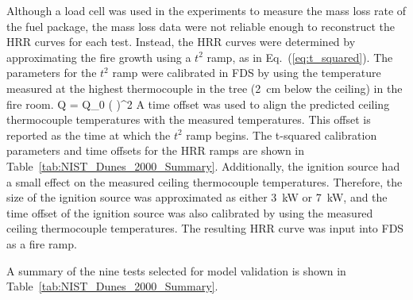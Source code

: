 Although a load cell was used in the experiments to measure the mass loss rate of the fuel package, the mass loss data
were not reliable enough to reconstruct the HRR curves for each test. Instead, the HRR curves were determined by approximating
the fire growth using a $t^2$ ramp, as in Eq.~(\ref{eq:t_squared}). The parameters for the $t^2$ ramp were calibrated in FDS
by using the temperature measured at the highest thermocouple in the tree (2~cm below the ceiling) in the fire room.
\be
\dot Q = \dot Q_0 \left(  \right)^2
\label{eq:t_squared}
\ee
A time offset was used to align the predicted ceiling thermocouple temperatures with the measured temperatures.
This offset is reported as the time at which the $t^2$ ramp begins.
The t-squared calibration parameters and time offsets for the HRR ramps are shown in Table~\ref{tab:NIST_Dunes_2000_Summary}.
Additionally, the ignition source had a small effect on the measured ceiling thermocouple temperatures. Therefore,
the size of the ignition source was approximated as either 3~kW or 7~kW, and the time offset of the ignition source was
also calibrated by using the measured ceiling thermocouple temperatures.
The resulting HRR curve was input into FDS as a fire ramp.

A summary of the nine tests selected for model validation is shown in Table~\ref{tab:NIST_Dunes_2000_Summary}.

